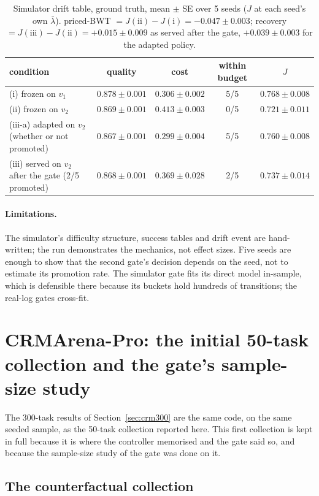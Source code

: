 \documentclass[10pt]{article}
\begin{document}
\begin{table}[htbp]
\centering\small
\caption{Simulator drift table, ground truth, mean $\pm$ SE over 5 seeds ($J$ at each seed's own $\bar\lambda$). priced-BWT $=J(\text{ii})-J(\text{i})=-0.047\pm0.003$; recovery $=J(\text{iii})-J(\text{ii})=+0.015\pm0.009$ as served after the gate, $+0.039\pm0.003$ for the adapted policy.}
\label{tab:simdrift}
\begin{tabular}{lcccc}
\toprule
condition & quality & cost & within budget & $J$ \\
\midrule
(i) frozen on $v_1$ & $0.878\pm0.001$ & $0.306\pm0.002$ & 5/5 & $0.768\pm0.008$ \\
(ii) frozen on $v_2$ & $0.869\pm0.001$ & $0.413\pm0.003$ & 0/5 & $0.721\pm0.011$ \\
(iii-a) adapted on $v_2$ (whether or not promoted) & $0.867\pm0.001$ & $0.299\pm0.004$ & 5/5 & $0.760\pm0.008$ \\
(iii) served on $v_2$ after the gate (2/5 promoted) & $0.868\pm0.001$ & $0.369\pm0.028$ & 2/5 & $0.737\pm0.014$ \\
\bottomrule
\end{tabular}
\end{table}

\paragraph{Limitations.} The simulator's difficulty structure, success tables and drift event are hand-written; the run demonstrates the mechanics, not effect sizes. Five seeds are enough to show that the second gate's decision depends on the seed, not to estimate its promotion rate. The simulator gate fits its direct model in-sample, which is defensible there because its buckets hold hundreds of transitions; the real-log gates cross-fit.

\section{CRMArena-Pro: the initial 50-task collection and the gate's sample-size study}
\label{app:crm50}

The 300-task results of Section~\ref{sec:crm300} are the same code, on the same seeded sample, as the 50-task collection reported here. This first collection is kept in full because it is where the controller memorised and the gate said so, and because the sample-size study of the gate was done on it.

\subsection{The counterfactual collection}
\label{sec:crm}
\end{document}
